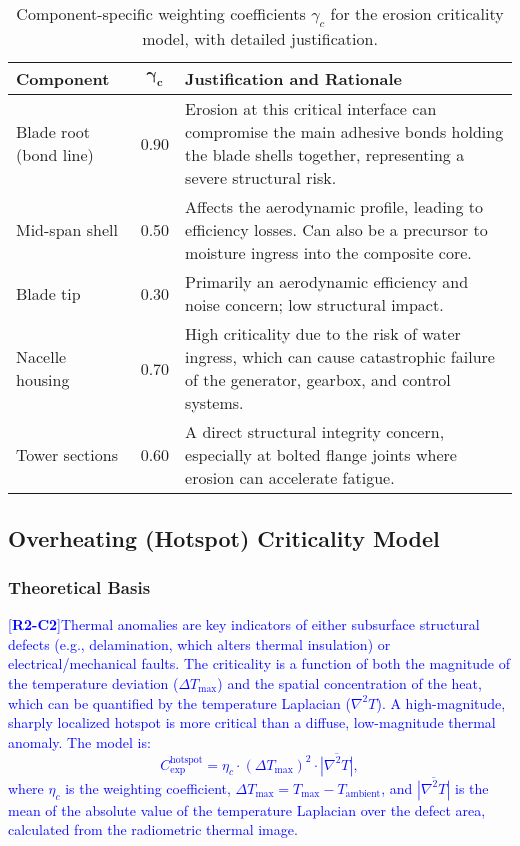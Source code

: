 \documentclass[energies,supfile,submit,pdftex,moreauthors]{Definitions/mdpi}
\newcommand{\revtag}[2]{[\textbf{R#1-C#2}]}
\newcommand{\Rtwo}[1]{\textcolor{blue}{#1}}
\begin{document}
\begin{table}[!htb]
\caption{Component-specific weighting coefficients \(\gamma_c\) for the erosion criticality model, with detailed justification.}
\label{tab:gamma_coeff}
\centering
\begin{tabularx}{\textwidth}{l c X}
\toprule
\textbf{Component} & \(\boldsymbol{\gamma_c}\) & \textbf{Justification and Rationale} \\
\midrule
Blade root (bond line) & 0.90 & Erosion at this critical interface can compromise the main adhesive bonds holding the blade shells together, representing a severe structural risk. \\
Mid-span shell & 0.50 & Affects the aerodynamic profile, leading to efficiency losses. Can also be a precursor to moisture ingress into the composite core. \\
Blade tip       & 0.30 & Primarily an aerodynamic efficiency and noise concern; low structural impact. \\
Nacelle housing & 0.70 & High criticality due to the risk of water ingress, which can cause catastrophic failure of the generator, gearbox, and control systems. \\
Tower sections  & 0.60 & A direct structural integrity concern, especially at bolted flange joints where erosion can accelerate fatigue. \\
\bottomrule
\end{tabularx}
\end{table}

\subsection{Overheating (Hotspot) Criticality Model}
\subsubsection{Theoretical Basis}
\Rtwo{\revtag{2}{2}Thermal anomalies are key indicators of either subsurface structural defects (e.g., delamination, which alters thermal insulation) or electrical/mechanical faults. The criticality is a function of both the magnitude of the temperature deviation (\(\Delta T_{\max}\)) and the spatial concentration of the heat, which can be quantified by the temperature Laplacian (\(\nabla^2 T\)). A high-magnitude, sharply localized hotspot is more critical than a diffuse, low-magnitude thermal anomaly. The model is:
\begin{equation}
 C_{\text{exp}}^{\text{hotspot}} = \eta_c \cdot \left(\Delta T_{\max}\right)^2 \cdot \overline{|\nabla^2 T|},
 \label{eq:heatingcrit}
\end{equation}
where \(\eta_c\) is the weighting coefficient, \(\Delta T_{\max} = T_{\max} - T_{\text{ambient}}\), and \(\overline{|\nabla^2 T|}\) is the mean of the absolute value of the temperature Laplacian over the defect area, calculated from the radiometric thermal image.
}
\end{document}
